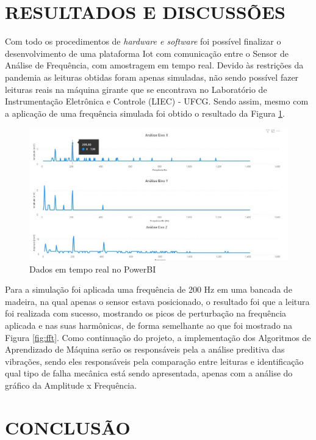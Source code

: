 \documentclass[
	article,			%
	12pt,				%
	oneside,			%
	a4paper,			%
	section=TITLE,		%
	subsection=TITLE,	%
	english,			%
	brazil,				%
	sumario=tradicional
	]{abntex2}
\begin{document}
\section*{RESULTADOS E DISCUSSÕES}
Com todo os procedimentos de \textit{hardware e software} foi possível finalizar o desenvolvimento de uma plataforma Iot com comunicação entre o Sensor de Análise de Frequência, com amostragem em tempo real. Devido às restrições da pandemia as leituras obtidas foram apenas simuladas, não sendo possível fazer leituras reais na máquina girante que se encontrava no Laboratório de Instrumentação Eletrônica e Controle (LIEC) - UFCG. Sendo assim, mesmo com a aplicação de uma frequência simulada foi obtido o resultado da Figura \ref{fig:power}. 


\begin{figure}[H]
    \centering
    \includegraphics[scale=0.5]{power_bi.jpeg}
    \caption{Dados em tempo real no PowerBI}
    \label{fig:power}
\end{figure}

Para a simulação foi aplicada uma frequência de 200 Hz em uma bancada de madeira, na qual apenas o sensor estava posicionado, o resultado foi que a leitura  foi realizada com sucesso, mostrando os picos de perturbação na frequência aplicada e nas suas harmônicas, de forma semelhante ao que foi mostrado na Figura \ref{fig:fft}. Como continuação do projeto, a implementação dos Algoritmos de Aprendizado de Máquina serão os responsáveis pela a análise preditiva das vibrações, sendo eles responsáveis pela comparação entre leituras e identificação qual tipo de falha mecânica está sendo apresentada, apenas com a análise do gráfico da Amplitude x Frequência. 

\section*{CONCLUSÃO}
\end{document}
